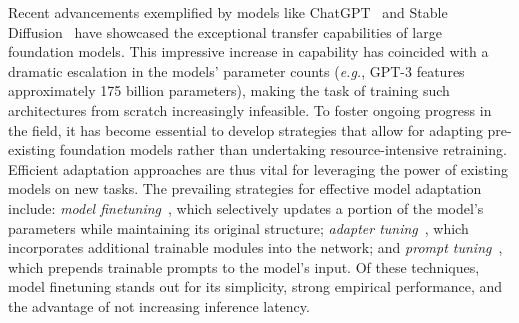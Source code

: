 Recent advancements exemplified by models like ChatGPT~\cite{brown2020language,chen2021evaluating} and Stable Diffusion~\cite{rombach2022high} have showcased the exceptional transfer capabilities of large foundation models. This impressive increase in capability has coincided with a dramatic escalation in the models’ parameter counts (\emph{e.g.}, GPT-3 features approximately 175 billion parameters), making the task of training such architectures from scratch increasingly infeasible. To foster ongoing progress in the field, it has become essential to develop strategies that allow for adapting pre-existing foundation models rather than undertaking resource-intensive retraining. Efficient adaptation approaches are thus vital for leveraging the power of existing models on new tasks. The prevailing strategies for effective model adaptation include: \emph{model finetuning}~\cite{hulora2022,zaken2022bitfit,guo2020parameter,raffel2020exploring,qiu2023controlling,zhang2022adaptive,chavan2023one}, which selectively updates a portion of the model’s parameters while maintaining its original structure; \emph{adapter tuning}~\cite{rebuffi2017learning,houlsby2019parameter,pfeiffer2020adapterfusion,lin2020exploring,he2021towards}, which incorporates additional trainable modules into the network; and \emph{prompt tuning}~\cite{li2021prefix,lester2021power}, which prepends trainable prompts to the model’s input. Of these techniques, model finetuning stands out for its simplicity, strong empirical performance, and the advantage of not increasing inference latency.

